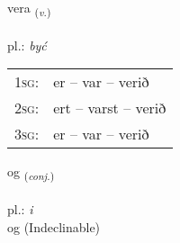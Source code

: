 \documentclass[frontgrid, backgrid]{flacards}\usepackage[]{graphicx}\usepackage[]{xcolor}
\begin{document}
\doublespacing











\renewcommand{\flhead}{\vskip5pt \fboxsep=0pt {\small\bfseries\footnotesize Sagnorð | Verb}}
\renewcommand{\fcfoot}{\vskip5pt \fboxsep=0pt \hspace{2pt}{\small\bfseries\footnotesize 1K}}

\renewcommand{\blhead}{\vskip5pt {\small\bfseries\footnotesize Sagnorð | Verb }}
\renewcommand{\bcfoot}{\vskip5pt \hspace{2pt}{\small\bfseries\footnotesize 1K}}


{vera \small{\textsubscript{(\textit{v.})}} \\[1ex] %
\textphonetic{[vɛːra]} \\
pl.: \emph{być} \\  [2ex]
\renewcommand*{\arraystretch}{0.8}
\begin{tabular}{p{1cm}l}
\textsc{1sg}: & er -- var -- verið \\ 
\textsc{2sg}: & ert -- varst -- verið \\ 
\textsc{3sg}: & er -- var -- verið \\ 
\end{tabular}
}


\renewcommand{\flhead}{\vskip5pt \fboxsep=0pt {\small\bfseries\footnotesize Samtenging | Conjuction}}
\renewcommand{\fcfoot}{\vskip5pt \fboxsep=0pt \hspace{2pt}{\small\bfseries\footnotesize 1K}}

\renewcommand{\blhead}{\vskip5pt {\small\bfseries\footnotesize Samtenging | Conjuction }}
\renewcommand{\bcfoot}{\vskip5pt \hspace{2pt}{\small\bfseries\footnotesize 1K}}


{og \small{\textsubscript{(\textit{conj.})}} \\[1ex]
\textphonetic{[ɔːɣ]} \\
pl.: \emph{i} \\  [2ex]
og (Indeclinable)}
\end{document}
